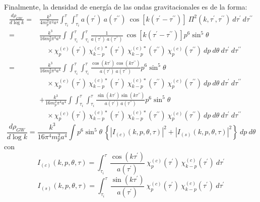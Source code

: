 Finalmente, la densidad de energía de las ondas gravitacionales es de la forma:
\begin{equation*}
    \begin{split}
        \frac{d \rho_{GW}}{d \log k} =& \frac{k^3}{4 m_p^2 \pi^2 a^4} \int_{\tau_i}^{\tau} \int_{\tau_i}^\tau a \left( \tau^\prime \right) ~ a \left( \tau^{\prime \prime} \right) ~ \cos \left[ k \left( \tau^{\prime} - \tau^{\prime \prime} \right) \right] ~ \Pi^2 \left( k, \tau^\prime, \tau^{\prime \prime} \right) ~ d\tau^\prime ~ d\tau^{\prime \prime}\\
        =& \frac{k^3}{16 m_p^2 \pi^4 a^4} \int \int_{\tau_i}^{\tau} \int_{\tau_i}^\tau \frac{1}{a \left( \tau^\prime \right) ~ a \left( \tau^{\prime \prime} \right)} ~ \cos \left[ k \left( \tau^{\prime} - \tau^{\prime \prime} \right) \right] p^6 \sin^5 \theta \\
        &\quad \times \chi^{(c)}_{p} (\tau^\prime) ~ \chi_{k - p}^{(c) *} (\tau^\prime) ~ \chi^{(c) *}_{k - p} (\tau^{\prime \prime}) ~ \chi^{(c)}_{p} (\tau^{\prime \prime}) ~ dp ~ d\theta ~ d\tau^\prime ~ d\tau^{\prime \prime}\\
        =& \frac{k^3}{16 m_p^2 \pi^4 a^4} \int \int_{\tau_i}^{\tau} \int_{\tau_i}^\tau \frac{\cos(k\tau^\prime) \cos (k\tau^{\prime \prime})}{a \left( \tau^\prime \right) ~ a \left( \tau^{\prime \prime} \right)} p^6 \sin^5 \theta \\
        &\quad \times \chi^{(c)}_{p} (\tau^\prime) ~ \chi_{k - p}^{(c) *} (\tau^\prime) ~ \chi^{(c) *}_{k - p} (\tau^{\prime \prime}) ~ \chi^{(c)}_{p} (\tau^{\prime \prime}) ~ dp ~ d\theta ~ d\tau^\prime ~ d\tau^{\prime \prime}\\
        &+ \frac{k^3}{16 m_p^2 \pi^4 a^4} \int \int_{\tau_i}^{\tau} \int_{\tau_i}^\tau \frac{\sin (k\tau^\prime) \sin (k\tau^{\prime \prime})}{a \left( \tau^\prime \right) ~ a \left( \tau^{\prime \prime} \right)} p^6 \sin^5 \theta \\
        &\quad \times \chi^{(c)}_{p} (\tau^\prime) ~ \chi_{k - p}^{(c) *} (\tau^\prime) ~ \chi^{(c) *}_{k - p} (\tau^{\prime \prime}) ~ \chi^{(c)}_{p} (\tau^{\prime \prime}) ~ dp ~ d\theta ~ d\tau^\prime ~ d\tau^{\prime \prime}
    \end{split}
\end{equation*}
\begin{equation}
    \frac{d \rho_{GW}}{d \log k} = \frac{k^3}{16 \pi^4 m_p^2 a^4} \int p^6 \sin^5 \theta ~ \left\{ \left| I_{(c)} (k, p, \theta, \tau)  \right|^2 + \left| I_{(s)} (k, p, \theta, \tau)  \right|^2 \right\} ~ dp ~ d\theta
\end{equation}
con
\begin{equation}
    I_{(c)} (k, p, \theta, \tau) = \int_{\tau_{i}}^\tau  \frac{\cos (k\tau^\prime)}{a \left( \tau^\prime \right)} ~ \chi^{(c)}_{p} (\tau^\prime) ~ \chi_{k - p}^{(c)} (\tau^\prime) ~ d\tau^\prime
\end{equation}
\begin{equation}
    I_{(s)} (k, p, \theta, \tau) = \int_{\tau_{i}}^\tau  \frac{\sin (k\tau^\prime)}{a \left( \tau^\prime \right)} ~ \chi^{(c)}_{p} (\tau^\prime) ~ \chi_{k - p}^{(c)} (\tau^\prime) ~ d\tau^\prime
\end{equation}

